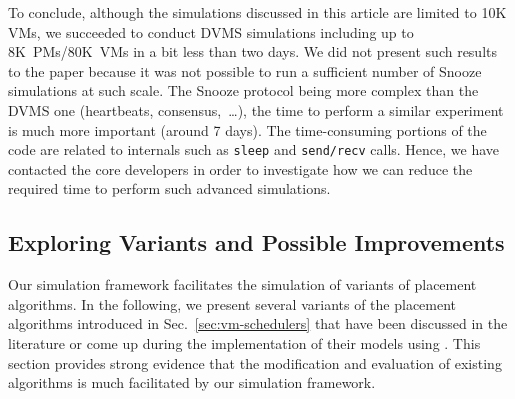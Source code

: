 
To conclude, although the simulations discussed in this article are
limited to 10K VMs, we succeeded to conduct DVMS simulations including
up to 8K~PMs/80K~VMs in a bit less than two days. We did not present
such results to the paper because it was not possible to run a
sufficient number of Snooze simulations at such scale. The Snooze
protocol being more complex than the DVMS one (heartbeats,
consensus,~\ldots), the time to perform a similar experiment is much
more important (around 7 days). The time-consuming portions of the
code are related to \sg internals such as \texttt{sleep} and
\texttt{send/recv} calls. Hence, we have contacted the \sg core
developers in order to investigate how we can reduce the required time
to perform such advanced simulations.


\subsection{Exploring Variants and Possible Improvements}


Our simulation framework facilitates the simulation of variants of
placement algorithms. In the following, we present several variants of
the placement algorithms introduced in Sec.~\ref{sec:vm-schedulers}
that have been discussed in the literature or come up during the
implementation of their models using \vmps. This section provides
strong evidence that the modification and evaluation of existing
algorithms is much facilitated by our simulation framework.




